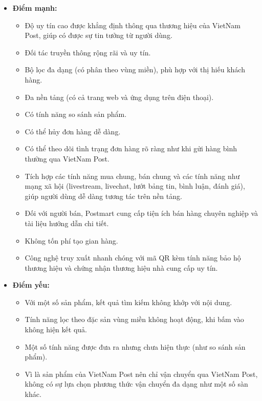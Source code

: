 \begin{itemize}
    \item \textbf{Điểm mạnh:}
        \begin{itemize}
            \item Độ uy tín cao được khẳng định thông qua thương hiệu của VietNam Post, giúp có được sự tin tưởng từ người dùng.
            \item Đối tác truyền thông rộng rãi và uy tín.
            \item Bộ lọc đa dạng (có phân theo vùng miền), phù hợp với thị hiếu khách hàng.
            \item Đa nền tảng (có cả trang web và ứng dụng trên điện thoại).
            \item Có tính năng so sánh sản phẩm.
            \item Có thể hủy đơn hàng dễ dàng.
            \item Có thể theo dõi tình trạng đơn hàng rõ ràng như khi gửi hàng bình thường qua VietNam Post.
            \item Tích hợp các tính năng mua chung, bán chung và các tính năng như mạng xã hội (livestream, livechat, lướt bảng tin, bình luận, đánh giá), giúp người dùng dễ dàng tương tác trên nền tảng.
            \item Đối với người bán, Postmart cung cấp tiện ích bán hàng chuyên nghiệp và tài liệu hướng dẫn chi tiết.
            \item Không tốn phí tạo gian hàng.
            \item Công nghệ truy xuất nhanh chóng với mã QR kèm tính năng bảo hộ thương hiệu và chứng nhận thương hiệu nhà cung cấp uy tín.
        \end{itemize}
    \item \textbf{Điểm yếu:}
        \begin{itemize}
            \item Với một số sản phẩm, kết quả tìm kiếm không khớp với nội dung.
            \item Tính năng lọc theo đặc sản vùng miền không hoạt động, khi bấm vào không hiện kết quả.
            \item Một số tính năng được đưa ra nhưng chưa hiện thực (như so sánh sản phẩm).
            \item Vì là sản phẩm của VietNam Post nên chỉ vận chuyển qua VietNam Post, không có sự lựa chọn phương thức vận chuyển đa dạng như một số sàn khác.
        \end{itemize}
\end{itemize}

